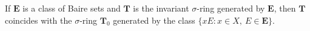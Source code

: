 If $\mathbf{E}$ is a class of Baire sets and $\mathbf{T}$ is the invariant $\sigma$-ring generated by $\mathbf{E}$, then $\mathbf{T}$ coincides with the $\sigma$-ring $\mathbf{T}_0$ generated by the class $\{xE : x \in X,\ E \in \mathbf{E}\}$.